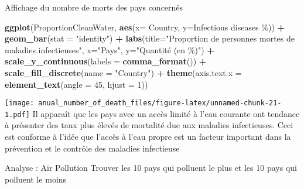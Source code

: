 \documentclass[
]{article}
\newenvironment{Shaded}{\begin{snugshade}}{\end{snugshade}}
\newcommand{\AttributeTok}[1]{\textcolor[rgb]{0.13,0.29,0.53}{#1}}
\newcommand{\DecValTok}[1]{\textcolor[rgb]{0.00,0.00,0.81}{#1}}
\newcommand{\FunctionTok}[1]{\textcolor[rgb]{0.13,0.29,0.53}{\textbf{#1}}}
\newcommand{\NormalTok}[1]{#1}
\newcommand{\SpecialCharTok}[1]{\textcolor[rgb]{0.81,0.36,0.00}{\textbf{#1}}}
\newcommand{\StringTok}[1]{\textcolor[rgb]{0.31,0.60,0.02}{#1}}
\begin{document}
Affichage du nombre de morts des pays concernés

\begin{Shaded}
\begin{Highlighting}[]
\FunctionTok{ggplot}\NormalTok{(ProportionCleanWater, }\FunctionTok{aes}\NormalTok{(}\AttributeTok{x=}\NormalTok{ Country, }\AttributeTok{y=}\StringTok{\textasciigrave{}}\AttributeTok{Infectious diseases \%}\StringTok{\textasciigrave{}}\NormalTok{)) }\SpecialCharTok{+} \FunctionTok{geom\_bar}\NormalTok{(}\AttributeTok{stat =} \StringTok{"identity"}\NormalTok{) }\SpecialCharTok{+} \FunctionTok{labs}\NormalTok{(}\AttributeTok{title=}\StringTok{"Proportion de personnes mortes de maladies infectieuses"}\NormalTok{, }\AttributeTok{x=}\StringTok{"Pays"}\NormalTok{, }\AttributeTok{y=}\StringTok{"Quantité (en \%)"}\NormalTok{) }\SpecialCharTok{+} \FunctionTok{scale\_y\_continuous}\NormalTok{(}\AttributeTok{labels =} \FunctionTok{comma\_format}\NormalTok{()) }\SpecialCharTok{+} \FunctionTok{scale\_fill\_discrete}\NormalTok{(}\AttributeTok{name =} \StringTok{"Country"}\NormalTok{) }\SpecialCharTok{+} 
  \FunctionTok{theme}\NormalTok{(}\AttributeTok{axis.text.x =} \FunctionTok{element\_text}\NormalTok{(}\AttributeTok{angle =} \DecValTok{45}\NormalTok{, }\AttributeTok{hjust =} \DecValTok{1}\NormalTok{))}
\end{Highlighting}
\end{Shaded}

\texttt{[image: anual\_number\_of\_death\_files/figure-latex/unnamed-chunk-21-1.pdf]}
Il apparaît que les pays avec un accès limité à l'eau courante ont
tendance à présenter des taux plus élevés de mortalité due aux maladies
infectieuses. Ceci est conforme à l'idée que l'accès à l'eau propre est
un facteur important dans la prévention et le contrôle des maladies
infectieuse

Analyse : Air Pollution Trouver les 10 pays qui polluent le plus et les
10 pays qui polluent le moins
\end{document}
